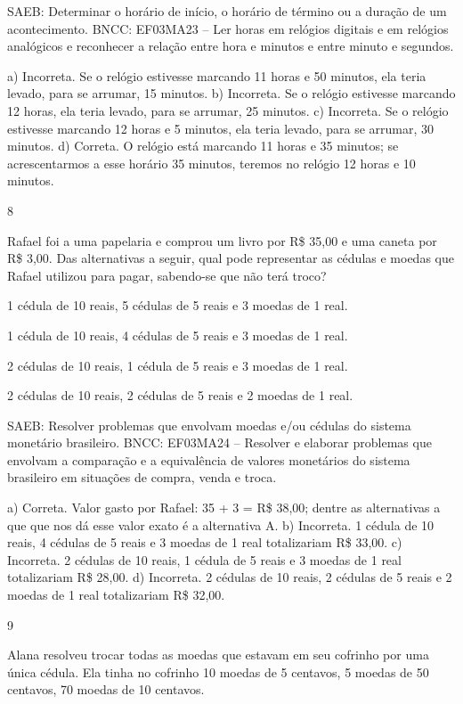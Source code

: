\begin{multicols}{2}
\begin{enumerate}
{SAEB: Determinar o horário de início, o horário de término ou a duração de um acontecimento.
BNCC: EF03MA23 – Ler horas em relógios digitais e em relógios analógicos e reconhecer a relação
entre hora e minutos e entre minuto e segundos.

a) Incorreta. Se o relógio estivesse marcando 11 horas e 50 minutos, ela teria levado, para se arrumar, 15 minutos.
b) Incorreta. Se o relógio estivesse marcando 12 horas, ela teria levado, para se arrumar, 25 minutos.
c) Incorreta. Se o relógio estivesse marcando 12 horas e 5 minutos, ela teria levado, para se arrumar, 30 minutos.
d) Correta. O relógio está marcando 11 horas e 35 minutos; se acrescentarmos a esse horário 35 minutos, teremos no relógio 12 horas e 10 minutos.

\num{8}

Rafael foi a uma papelaria e comprou um livro por R\$ 35,00 e uma caneta
por R\$ 3,00. Das alternativas a seguir, qual pode representar as cédulas
e moedas que Rafael utilizou para pagar, sabendo-se que não terá troco?

\begin{escolha}

\item
  1 cédula de 10 reais, 5 cédulas de 5 reais e 3 moedas de 1 real.
\item
  1 cédula de 10 reais, 4 cédulas de 5 reais e 3 moedas de 1 real.
\item
  2 cédulas de 10 reais, 1 cédula de 5 reais e 3 moedas de 1 real.
\item
  2 cédulas de 10 reais, 2 cédulas de 5 reais e 2 moedas de 1 real.
\end{escolha}

SAEB: Resolver problemas que envolvam moedas e/ou cédulas do sistema monetário brasileiro.
BNCC: EF03MA24 -- Resolver e elaborar problemas que envolvam a comparação e a equivalência de
valores monetários do sistema brasileiro em situações de compra, venda e troca.

a) Correta. Valor gasto por Rafael: 35 + 3 = R\$ 38,00; dentre as alternativas a que que nos dá esse valor exato é a alternativa A.
b) Incorreta. 1 cédula de 10 reais, 4 cédulas de 5 reais e 3 moedas de 1 real totalizariam R\$ 33,00.
c) Incorreta. 2 cédulas de 10 reais, 1 cédula de 5 reais e 3 moedas de 1 real totalizariam R\$ 28,00.
d) Incorreta. 2 cédulas de 10 reais, 2 cédulas de 5 reais e 2 moedas de 1 real totalizariam R\$ 32,00.

\num{9}

Alana resolveu trocar todas as moedas que estavam em seu cofrinho por uma única cédula. Ela tinha no cofrinho 10 moedas de 5 centavos, 5 moedas de
50 centavos, 70 moedas de 10 centavos.

}
\end{enumerate}
\end{multicols}
